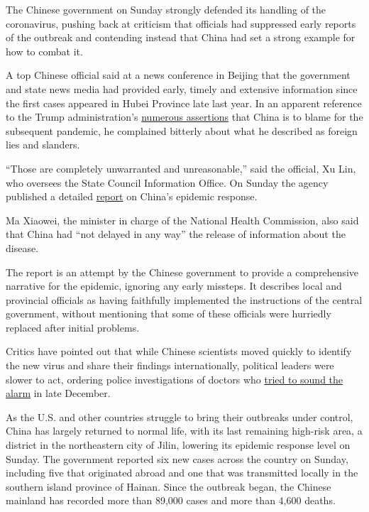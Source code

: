 The Chinese government on Sunday strongly defended its handling of the
coronavirus, pushing back at criticism that officials had suppressed
early reports of the outbreak and contending instead that China had set
a strong example for how to combat it.

A top Chinese official said at a news conference in Beijing that the
government and state news media had provided early, timely and extensive
information since the first cases appeared in Hubei Province late last
year. In an apparent reference to the Trump administration's
\href{https://www.nytimes3xbfgragh.onion/2020/05/29/health/virus-who.html}{numerous
assertions} that China is to blame for the subsequent pandemic, he
complained bitterly about what he described as foreign lies and
slanders.

``Those are completely unwarranted and unreasonable,'' said the
official, Xu Lin, who oversees the State Council Information Office. On
Sunday the agency published a detailed
\href{http://english.scio.gov.cn/whitepapers/2020-06/07/content_76135269.htm}{report}
on China's epidemic response.

Ma Xiaowei, the minister in charge of the National Health Commission,
also said that China had ``not delayed in any way'' the release of
information about the disease.

The report is an attempt by the Chinese government to provide a
comprehensive narrative for the epidemic, ignoring any early missteps.
It describes local and provincial officials as having faithfully
implemented the instructions of the central government, without
mentioning that some of these officials were hurriedly replaced after
initial problems.

Critics have pointed out that while Chinese scientists moved quickly to
identify the new virus and share their findings internationally,
political leaders were slower to act, ordering police investigations of
doctors who
\href{https://www.nytimes3xbfgragh.onion/2020/02/01/world/asia/china-coronavirus.html}{tried
to sound the alarm} in late December.

As the U.S. and other countries struggle to bring their outbreaks under
control, China has largely returned to normal life, with its last
remaining high-risk area, a district in the northeastern city of Jilin,
lowering its epidemic response level on Sunday. The government reported
six new cases across the country on Sunday, including five that
originated abroad and one that was transmitted locally in the southern
island province of Hainan. Since the outbreak began, the Chinese
mainland has recorded more than 89,000 cases and more than 4,600 deaths.

